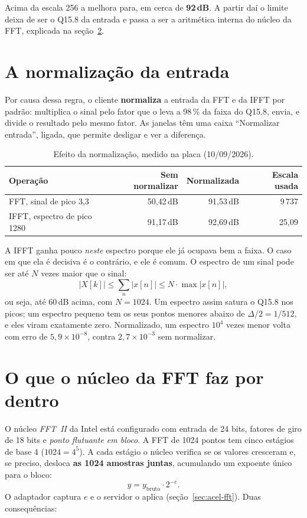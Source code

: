 Acima da escala 256 a melhora para, em cerca de \textbf{92\,dB}. A partir daí o
limite deixa de ser o Q15.8 da entrada e passa a ser a aritmética interna do
núcleo da FFT, explicada na seção~\ref{sec:bfp}.

\section{A normalização da entrada}
\label{sec:normalizacao}

Por causa dessa regra, o cliente \textbf{normaliza} a entrada da FFT e da IFFT
por padrão: multiplica o sinal pelo fator que o leva a 98\,\% da faixa do
Q15.8, envia, e divide o resultado pelo mesmo fator. As janelas têm uma caixa
``Normalizar entrada'', ligada, que permite desligar e ver a diferença.

\begin{table}[htbp]
  \centering
  \small
  \caption{Efeito da normalização, medido na placa (10/09/2026).}
  \label{tab:normalizacao}
  \begin{tabular}{@{}lrrr@{}}
    \toprule
    \textbf{Operação} & \textbf{Sem normalizar} & \textbf{Normalizada}
      & \textbf{Escala usada} \\
    \midrule
    FFT, sinal de pico 3,3      & 50,42\,dB & 91,53\,dB & 9\,737 \\
    IFFT, espectro de pico 1280 & 91,17\,dB & 92,69\,dB & 25,09 \\
    \bottomrule
  \end{tabular}
\end{table}

A IFFT ganha pouco \emph{neste} espectro porque ele já ocupava bem a faixa. O
caso em que ela é decisiva é o contrário, e ele é comum. O espectro de um sinal
pode ser até \(N\) vezes maior que o sinal:
\[
  |X[k]| \le \sum_n |x[n]| \le N \cdot \max |x[n]|,
\]
ou seja, até 60\,dB acima, com \(N = 1024\). Um espectro assim satura o Q15.8
nos picos; um espectro pequeno tem os seus pontos menores abaixo de
\(\Delta/2 = 1/512\), e eles viram exatamente zero. Normalizado, um espectro
\(10^{4}\) vezes menor volta com erro de \(5{,}9\times10^{-8}\), contra
\(2{,}7\times10^{-3}\) sem normalizar.

\section{O que o núcleo da FFT faz por dentro}
\label{sec:bfp}

O núcleo \emph{FFT~II} da Intel está configurado com entrada de 24 bits,
fatores de giro de 18 bits e \emph{ponto flutuante em bloco}. A FFT de 1024
pontos tem cinco estágios de base 4 (\(1024 = 4^5\)). A cada estágio o núcleo
verifica se os valores cresceram e, se preciso, desloca \textbf{as 1024
amostras juntas}, acumulando um expoente único para o bloco:
\[
  y = y_{\text{bruto}} \cdot 2^{-e}.
\]
O adaptador captura \(e\) e o servidor o aplica (seção~\ref{sec:acel-fft}).
Duas consequências:


